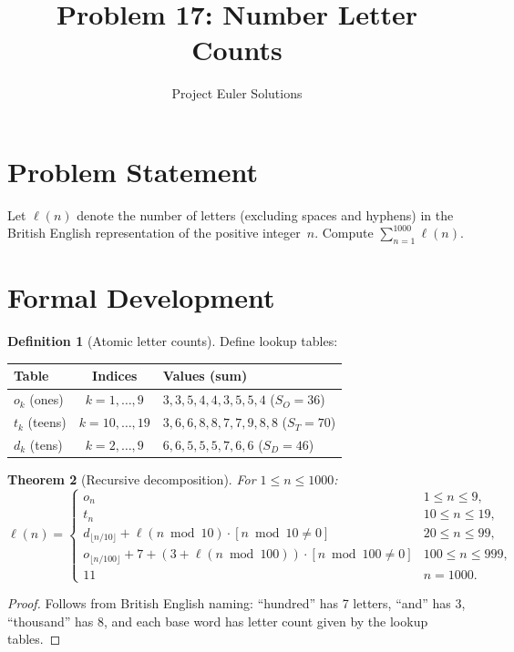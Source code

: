 \documentclass[12pt,a4paper]{article}
\title{Problem 17: Number Letter Counts}
\author{Project Euler Solutions}
\date{}
\newtheorem{theorem}{Theorem}
\theoremstyle{definition}
\newtheorem{definition}[theorem]{Definition}
\begin{document}
\maketitle

\section{Problem Statement}
Let $\ell(n)$ denote the number of letters (excluding spaces and hyphens) in the British
English representation of the positive integer~$n$. Compute $\sum_{n=1}^{1000} \ell(n)$.

\section{Formal Development}

\begin{definition}[Atomic letter counts]
Define lookup tables:
\begin{center}
\begin{tabular}{lcl}
\toprule
Table & Indices & Values (sum) \\
\midrule
$o_k$ (ones) & $k = 1,\ldots,9$ & $3,3,5,4,4,3,5,5,4$ \quad ($S_O = 36$) \\
$t_k$ (teens) & $k = 10,\ldots,19$ & $3,6,6,8,8,7,7,9,8,8$ \quad ($S_T = 70$) \\
$d_k$ (tens) & $k = 2,\ldots,9$ & $6,6,5,5,5,7,6,6$ \quad ($S_D = 46$) \\
\bottomrule
\end{tabular}
\end{center}
\end{definition}

\begin{theorem}[Recursive decomposition]
\label{thm:decomp}
For $1 \le n \le 1000$:
\[
\ell(n) = \begin{cases}
o_n & 1 \le n \le 9, \\
t_n & 10 \le n \le 19, \\
d_{\lfloor n/10 \rfloor} + \ell(n \bmod 10)\cdot[n \bmod 10 \ne 0] & 20 \le n \le 99, \\
o_{\lfloor n/100 \rfloor} + 7 + (3 + \ell(n \bmod 100))\cdot[n \bmod 100 \ne 0] & 100 \le n \le 999, \\
11 & n = 1000.
\end{cases}
\]
\end{theorem}

\begin{proof}
Follows from British English naming: ``hundred'' has 7 letters, ``and'' has 3,
``thousand'' has 8, and each base word has letter count given by the lookup tables.
\end{proof}
\end{document}

